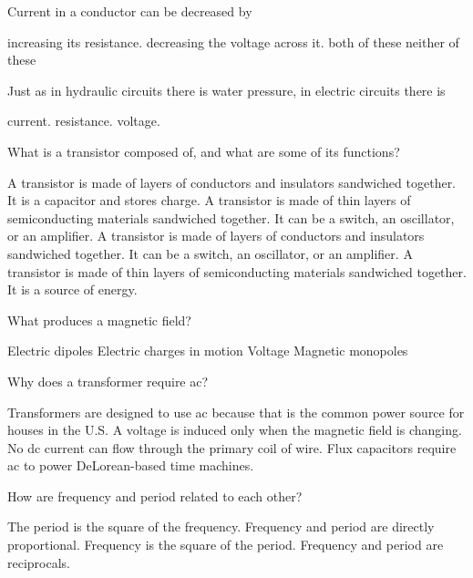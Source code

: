 \documentclass{exam}
\begin{document}
\begin{questions}
\question Current in a conductor can be decreased by
\begin{choices}
  \choice increasing its resistance.
  \choice decreasing the voltage across it.
  \choice both of these
  \choice neither of these
\end{choices}
\vfill{}

\question Just as in hydraulic circuits there is water pressure, in electric circuits there is
\begin{choices}
  \choice current.
  \choice resistance.
  \choice voltage.
\end{choices}
\vfill{}

\newpage{}

\question What is a transistor composed of, and what are some of its functions?
\begin{choices}
  \choice A transistor is made of layers of conductors and insulators sandwiched together. It is a capacitor and stores charge.
  \choice A transistor is made of thin layers of semiconducting materials sandwiched together. It can be a switch, an oscillator, or an amplifier.
  \choice A transistor is made of layers of conductors and insulators sandwiched together. It can be a switch, an oscillator, or an amplifier.
  \choice A transistor is made of thin layers of semiconducting materials sandwiched together. It is a source of energy.
\end{choices}
\vfill{}

\question What produces a magnetic field?
\begin{choices}
  \choice Electric dipoles
  \choice Electric charges in motion
  \choice Voltage
  \choice Magnetic monopoles
\end{choices}
\vfill{}

\question Why does a transformer require ac?
\begin{choices}
  \choice Transformers are designed to use ac because that is the common power source for houses in the U.S.
  \choice A voltage is induced only when the magnetic field is changing.
  \choice No dc current can flow through the primary coil of wire.
  \choice Flux capacitors require ac to power DeLorean-based time machines.
\end{choices}
\vfill{}

\question How are frequency and period related to each other?
\begin{choices}
  \choice The period is the square of the frequency.
  \choice Frequency and period are directly proportional.
  \choice Frequency is the square of the period.
  \choice Frequency and period are reciprocals.
\end{choices}
\vfill{}


\end{questions}
\end{document}
